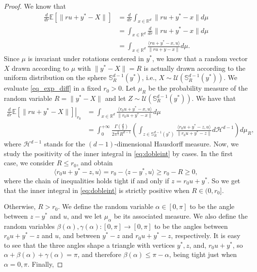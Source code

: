 \documentclass[10pt,a4paper]{amsart}
\newcommand{\E}{\mathbb{E}}
\newcommand{\HH}{\mathcal{H}}
\newcommand{\R}{\mathbb{R}}
\newcommand{\U}{\mathcal{U}}
\renewcommand{\SS}{\mathbb{S}}
\begin{document}
\begin{proof}
    We know that
    \begin{align}
        \frac{d}{dr}\E\left[\|ru+y^*-X\|\right]&=\frac{d}{dr}\int_{x\in \R^d}\|ru+y^*-x\|d\mu \nonumber\\
        & = \int_{x\in \R^d}\frac{d}{dr}\|ru+y^*-x\|d\mu \nonumber\\
        & = \int_{x\in \R^d}\frac{\langle ru+y^*-x, u\rangle}{\|ru+y-x\|}d\mu \label{eq_exp_diff}.
    \end{align}
    Since $\mu$ is invariant under rotations centered in $y^*$, we know that a random vector $X$ drawn according to $\mu$ with $\|y^*-X\|=R$ is actually drawn according to the uniform distribution on the sphere $\SS^{d-1}_R(y^*)$, i.e., $X\sim \U(\SS_R^{d-1}(y^*))$. We evaluate \eqref{eq_exp_diff} in a fixed $r_0>0$. Let $\mu_{R}$ be the probability measure of the random variable $R=\|y^*-X\|$ and let $Z\sim \U(\SS_R^{d-1}(y^*))$. We have that
    \begin{align}
        \left.\frac{d}{dr}\E\left[\|ru+y^*-X\|\right]\right|_{r_0}& = \int_{x\in \R^d}\frac{\langle r_0u+y^*-x, u\rangle}{\|r_0u+y^*-x\|}d\mu \nonumber \\
        & = \int_0^{+\infty}\frac{\Gamma\left(\frac{d}{2}\right)}{2\pi^{\frac{d}{2}}R^{d-1}}\left(\int_{z\in\SS^{d-1}_R(y^*)}\frac{\langle r_0u+y^*-z, u\rangle}{\|r_0u+y^*-z\|}d\HH^{d-1}\right)d\mu_R,\label{eq:dobleint}
    \end{align}
    where $\HH^{d-1}$ stands for the $(d-1)$-dimensional Hausdorff measure. Now, we study the positivity of the inner integral in \eqref{eq:dobleint} by cases. In the first case, we consider $R\leq r_0$, and obtain
    \begin{equation*}
        \langle r_0u+y^*-z, u\rangle = r_0-\langle z-y^*,u\rangle \geq r_0-R\geq 0,
    \end{equation*}
    where the chain of inequalities holds tight if and only if $z = r_0u+y^*$. So we get that the inner integral in \eqref{eq:dobleint} is strictly positive when $R \in (0, r_0]$. 

    Otherwise, $R>r_0$. We define the random variable $\alpha\in[0, \pi]$ to be the angle between $z-y^*$ and $u$, and we let $\mu_\alpha$ be its associated measure. We also define the random variables $\beta(\alpha), \gamma(\alpha):[0, \pi ]\to [0, \pi ]$ to be the angles between $r_0u+y^* -z$ and $u$, and between $y^*-z$ and $r_0u+y^*-z$, respectively. It is easy to see that the three angles shape a triangle with vertices $y^*, z$, and, $r_0u+y^*$, so $\alpha+\beta(\alpha)+\gamma(\alpha)=\pi$, and therefore $\beta(\alpha)\leq \pi-\alpha$, being tight just when $\alpha=0,\pi$. Finally,


\end{proof}
\end{document}
